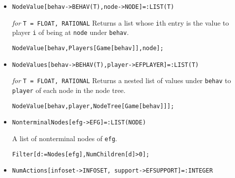 \begin{itemize}
\item{}
\protect \large \begin{verbatim}
NodeValue[behav->BEHAV(T),node->NODE]=:LIST(T)
\end{verbatim}\normalsize

{\it for} {\tt T = FLOAT, RATIONAL}
\bd 
Returns a list whose \verb+i+th entry is the value to player \verb+i+
of being at \verb+node+ under \verb+behav+.
\begin{verbatim}
NodeValue[behav,Players[Game[behav]],node];
\end{verbatim} 
\ed

\item{}
\protect \large \begin{verbatim}
NodeValues[behav->BEHAV(T),player->EFPLAYER]=:LIST(T)
\end{verbatim}\normalsize

{\it for} {\tt T = FLOAT, RATIONAL} 
\bd 
Returns a nested list of values under \verb+behav+ to \verb+player+ of
each node in the node tree.
\begin{verbatim}
NodeValue[behav,player,NodeTree[Game[behav]]];
\end{verbatim} 
\ed



\item{}
\protect \large \begin{verbatim}
NonterminalNodes[efg->EFG]=:LIST(NODE)
\end{verbatim}\normalsize

\bd 
A list of nonterminal nodes of \verb+efg+.
\begin{verbatim}
Filter[d:=Nodes[efg],NumChildren[d]>0];
\end{verbatim} 
\ed

\item{}
\protect \large \begin{verbatim}
NumActions[infoset->INFOSET, support->EFSUPPORT]=:INTEGER
\end{verbatim}\normalsize


\end{itemize}
